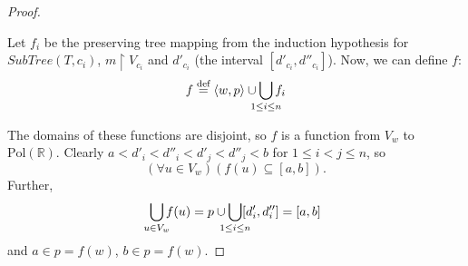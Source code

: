 \documentclass{article}
\newcommand{\R}{\mathbb{R}}
\newcommand{\Pol}{\text{Pol}}
\newcommand{\eqdef}{\stackrel{\text{def}}{=}}
\begin{document}
\begin{proof}
\begin{figure}[ht]
  \end{figure}

  Let $f_i$ be the preserving tree mapping from the induction hypothesis for $SubTree(T, c_i)$, $m \restriction V_{c_i}$ and $d'_{c_i}$ (the interval $[d'_{c_i}, d''_{c_i}]$). Now, we can define $f$:
  \begin{equation*}
    f \eqdef \langle w, p \rangle \cup \bigcup_{\mathclap{1 \leq i \leq n}}f_i
  \end{equation*}

  The domains of these functions are disjoint, so $f$ is a function from $V_w$ to $\Pol(\R)$. Clearly $a < d'_i < d''_i < d'_j < d''_j < b$ for $1 \leq i < j \leq n$, so
  \begin{equation*}
    (\forall u \in V_w)(f(u) \subseteq [a, b]).
  \end{equation*}
  Further,
  \begin{equation*}
    \bigcup_{\mathclap{u \in V_w}}f(u) = p \cup \bigcup_{\mathclap{1 \leq i \leq n}} [d'_i, d''_{i}] = [a, b]
  \end{equation*}
  and $a \in p = f(w)$, $b \in p = f(w)$.


\end{proof}
\end{document}
